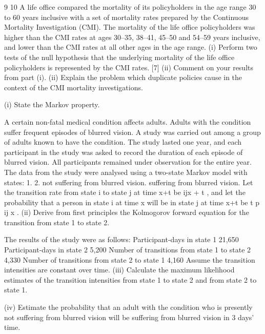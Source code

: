 \documentclass[a4paper,12pt]{article}
\begin{document}
\begin{enumerate}

9
10
A life office compared the mortality of its policyholders in the age range 30 to 60
years inclusive with a set of mortality rates prepared by the Continuous Mortality
Investigation (CMI). The mortality of the life office policyholders was higher than
the CMI rates at ages 30–35, 38–41, 45–50 and 54–59 years inclusive, and lower than
the CMI rates at all other ages in the age range.
(i) Perform two tests of the null hypothesis that the underlying mortality of the
life office policyholders is represented by the CMI rates.
[7]
(ii) Comment on your results from part (i).
(ii) Explain the problem which duplicate policies cause in the context of the CMI
mortality investigations.

(i) State the Markov property.


A certain non-fatal medical condition affects adults. Adults with the condition suffer
frequent episodes of blurred vision. A study was carried out among a group of adults
known to have the condition. The study lasted one year, and each participant in the
study was asked to record the duration of each episode of blurred vision. All
participants remained under observation for the entire year.
The data from the study were analysed using a two-state Markov model with states:
1.
2.
not suffering from blurred vision.
suffering from blurred vision.
Let the transition rate from state i to state j at time x+t be \mu ijx + t , and let the probability
that a person in state i at time x will be in state j at time x+t be t p ij x .
(ii)
Derive from first principles the Kolmogorov forward equation for the
transition from state 1 to state 2.

The results of the study were as follows:
Participant-days in state 1
21,650
Participant-days in state 2
5,200
Number of transitions from state 1 to state 2 4,330
Number of transitions from state 2 to state 1 4,160
Assume the transition intensities are constant over time.
(iii) Calculate the maximum likelihood estimates of the transition intensities from
state 1 to state 2 and from state 2 to state 1.

(iv) Estimate the probability that an adult with the condition who is presently not
suffering from blurred vision will be suffering from blurred vision in 3 days’
time.


\newpage


\end{enumerate}
\end{document}
